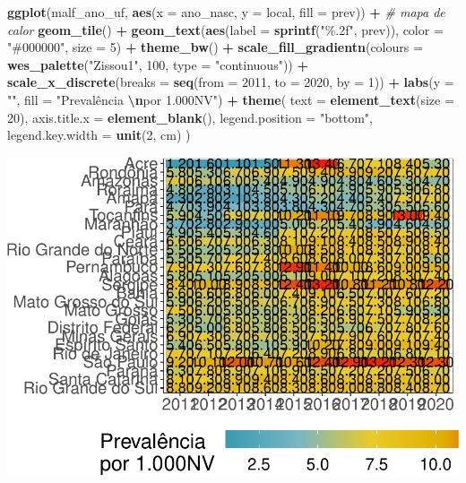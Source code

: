 \documentclass[
]{article}
\newenvironment{Shaded}{\begin{snugshade}}{\end{snugshade}}
\newcommand{\AttributeTok}[1]{\textcolor[rgb]{0.13,0.29,0.53}{#1}}
\newcommand{\CommentTok}[1]{\textcolor[rgb]{0.56,0.35,0.01}{\textit{#1}}}
\newcommand{\DecValTok}[1]{\textcolor[rgb]{0.00,0.00,0.81}{#1}}
\newcommand{\FunctionTok}[1]{\textcolor[rgb]{0.13,0.29,0.53}{\textbf{#1}}}
\newcommand{\NormalTok}[1]{#1}
\newcommand{\SpecialCharTok}[1]{\textcolor[rgb]{0.81,0.36,0.00}{\textbf{#1}}}
\newcommand{\StringTok}[1]{\textcolor[rgb]{0.31,0.60,0.02}{#1}}
\begin{document}
\begin{Shaded}
\begin{Highlighting}[]
\FunctionTok{ggplot}\NormalTok{(malf\_ano\_uf, }\FunctionTok{aes}\NormalTok{(}\AttributeTok{x =}\NormalTok{ ano\_nasc, }\AttributeTok{y =}\NormalTok{ local, }\AttributeTok{fill =}\NormalTok{ prev)) }\SpecialCharTok{+}
  \CommentTok{\# mapa de calor}
  \FunctionTok{geom\_tile}\NormalTok{() }\SpecialCharTok{+}
  \FunctionTok{geom\_text}\NormalTok{(}\FunctionTok{aes}\NormalTok{(}\AttributeTok{label =} \FunctionTok{sprintf}\NormalTok{(}\StringTok{"\%.2f"}\NormalTok{, prev)), }\AttributeTok{color =} \StringTok{"\#000000"}\NormalTok{, }\AttributeTok{size =} \DecValTok{5}\NormalTok{) }\SpecialCharTok{+}
  \FunctionTok{theme\_bw}\NormalTok{() }\SpecialCharTok{+}
  \FunctionTok{scale\_fill\_gradientn}\NormalTok{(}\AttributeTok{colours =} \FunctionTok{wes\_palette}\NormalTok{(}\StringTok{"Zissou1"}\NormalTok{, }\DecValTok{100}\NormalTok{, }\AttributeTok{type =} \StringTok{"continuous"}\NormalTok{)) }\SpecialCharTok{+} 
  \FunctionTok{scale\_x\_discrete}\NormalTok{(}\AttributeTok{breaks =} \FunctionTok{seq}\NormalTok{(}\AttributeTok{from =} \DecValTok{2011}\NormalTok{, }\AttributeTok{to =} \DecValTok{2020}\NormalTok{, }\AttributeTok{by =} \DecValTok{1}\NormalTok{)) }\SpecialCharTok{+}
  \FunctionTok{labs}\NormalTok{(}\AttributeTok{y =} \StringTok{""}\NormalTok{, }\AttributeTok{fill =} \StringTok{"Prevalência }\SpecialCharTok{\textbackslash{}n}\StringTok{por 1.000NV"}\NormalTok{) }\SpecialCharTok{+}
  \FunctionTok{theme}\NormalTok{(}
    \AttributeTok{text =} \FunctionTok{element\_text}\NormalTok{(}\AttributeTok{size =} \DecValTok{20}\NormalTok{),}
    \AttributeTok{axis.title.x =} \FunctionTok{element\_blank}\NormalTok{(),}
    \AttributeTok{legend.position =} \StringTok{"bottom"}\NormalTok{,}
    \AttributeTok{legend.key.width =} \FunctionTok{unit}\NormalTok{(}\DecValTok{2}\NormalTok{, }\StringTok{\textquotesingle{}cm\textquotesingle{}}\NormalTok{)}
\NormalTok{  )}
\end{Highlighting}
\end{Shaded}

\includegraphics{anom_files/figure-latex/unnamed-chunk-32-1.pdf}
\end{document}
